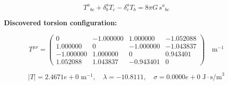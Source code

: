 
\begin{equation}
  T^a{}_{bc} + \delta^a_b T_c - \delta^a_c T_b = 8\pi G \, s^a{}_{bc}
\end{equation}

\textbf{Discovered torsion configuration:}

\begin{equation}
  T^{\mu\nu} = \begin{pmatrix}
    0 & -1.000000 & 1.000000 & -1.052088 \\
    1.000000 & 0 & -1.000000 & -1.043837 \\
    -1.000000 & 1.000000 & 0 & 0.943401 \\
    1.052088 & 1.043837 & -0.943401 & 0
  \end{pmatrix} \quad \text{m}^{-1}
\end{equation}

\begin{equation}
  |T| = 2.4671e+0 \text{ m}^{-1}, \quad
  \lambda = -10.8111, \quad
  \sigma = 0.0000e+0 \text{ J}\cdot\text{s/m}^3
\end{equation}